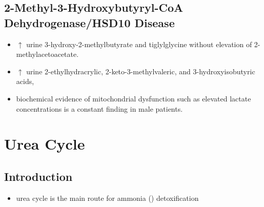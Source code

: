 \documentclass[12pt]{scrartcl}
\begin{document}
\subsection{2-Methyl-3-Hydroxybutyryl-CoA Dehydrogenase/HSD10 Disease}
\label{sec:orgdfbf5fa}
\begin{itemize}
\item \(\uparrow\) urine 3-hydroxy-2-methylbutyrate and tiglylglycine without elevation of 2-methylacetoacetate.
\item \(\uparrow\) urine 2-ethylhydracrylic, 2-keto-3-methylvaleric, and 3-hydroxyisobutyric acids,
\item biochemical evidence of mitochondrial dysfunction such as elevated
lactate concentrations is a constant finding in male patients.
\end{itemize}

\section{Urea Cycle}
\label{sec:org4fbbed9}
\subsection{Introduction}
\label{sec:orgb1e2a40}
\begin{itemize}
\item urea cycle is the main route for ammonia () detoxification
\end{itemize}

\begin{center}
\chemnameinit{}
\hspace{20}
\chemnameinit{}
\end{center}

\begin{center}
\chemnameinit{}
\end{center}

\begin{center}
\chemnameinit{}
\end{center}
\end{document}

